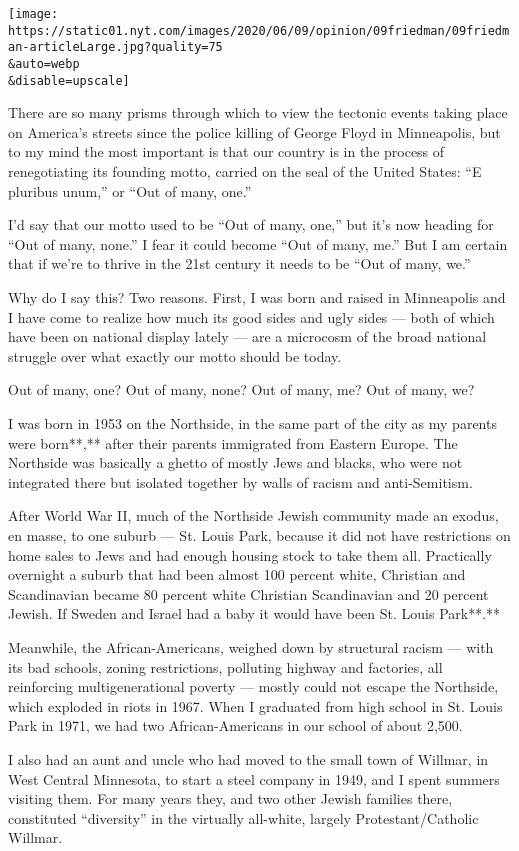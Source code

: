\texttt{[image: https://static01.nyt.com/images/2020/06/09/opinion/09friedman/09friedman-articleLarge.jpg?quality=75\\\&auto=webp\\\&disable=upscale]}

There are so many prisms through which to view the tectonic events
taking place on America's streets since the police killing of George
Floyd in Minneapolis, but to my mind the most important is that our
country is in the process of renegotiating its founding motto, carried
on the seal of the United States: ``E pluribus unum,'' or ``Out of many,
one.''

I'd say that our motto used to be ``Out of many, one,'' but it's now
heading for ``Out of many, none.'' I fear it could become ``Out of many,
me.'' But I am certain that if we're to thrive in the 21st century it
needs to be ``Out of many, we.''

Why do I say this? Two reasons. First, I was born and raised in
Minneapolis and I have come to realize how much its good sides and ugly
sides --- both of which have been on national display lately --- are a
microcosm of the broad national struggle over what exactly our motto
should be today.

Out of many, one? Out of many, none? Out of many, me? Out of many, we?

I was born in 1953 on the Northside, in the same part of the city as my
parents were born**,** after their parents immigrated from Eastern
Europe. The Northside was basically a ghetto of mostly Jews and blacks,
who were not integrated there but isolated together by walls of racism
and anti-Semitism.

After World War II, much of the Northside Jewish community made an
exodus, en masse, to one suburb --- St. Louis Park, because it did not
have restrictions on home sales to Jews and had enough housing stock to
take them all. Practically overnight a suburb that had been almost 100
percent white, Christian and Scandinavian became 80 percent white
Christian Scandinavian and 20 percent Jewish. If Sweden and Israel had a
baby it would have been St. Louis Park**.**

Meanwhile, the African-Americans, weighed down by structural racism ---
with its bad schools, zoning restrictions, polluting highway and
factories, all reinforcing multigenerational poverty --- mostly could
not escape the Northside, which exploded in riots in 1967. When I
graduated from high school in St. Louis Park in 1971, we had two
African-Americans in our school of about 2,500.

I also had an aunt and uncle who had moved to the small town of Willmar,
in West Central Minnesota, to start a steel company in 1949, and I spent
summers visiting them. For many years they, and two other Jewish
families there, constituted ``diversity'' in the virtually all-white,
largely Protestant/Catholic Willmar.

